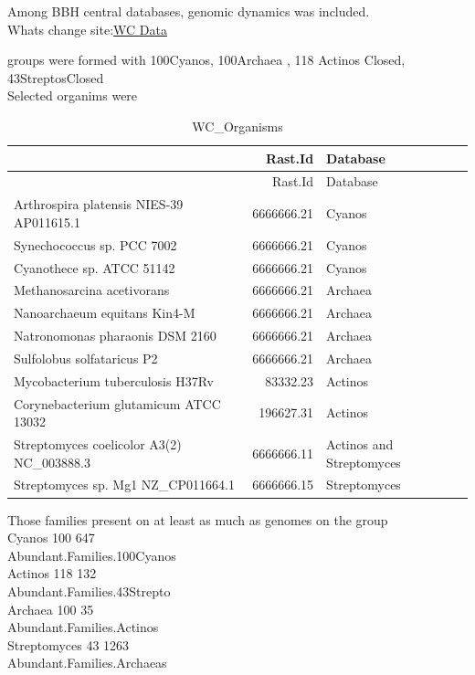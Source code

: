 \documentclass[12pt,twoside]{reedthesis}
\begin{document}
  Among BBH central databases, genomic dynamics was included.\\
  Whats change
  site:\href{http://pubseed.theseed.org/wc.cgi?request=show_otus\&base=/homes/nselem/Data/CS}{WC
  Data}
  
  groups were formed with 100Cyanos, 100Archaea , 118 Actinos Closed,
  43StreptosClosed\\
  Selected organims were
  
  \begin{Shaded}
  \begin{Highlighting}[]
  \StringTok{ }\NormalTok{(}\NormalTok{, } \NormalTok{,}\NormalTok{)}
   \CharTok{\textbackslash{}\textbackslash{}}\NormalTok{,} \NormalTok{)}
  \end{Highlighting}
  \end{Shaded}
  
  \begin{longtable}[]{@{}lrl@{}}
  \caption{WC\_Organisms \label{tab:WC_Organisms}}\tabularnewline
  \toprule
  & Rast.Id & Database\tabularnewline
  \midrule
  \endfirsthead
  \toprule
  & Rast.Id & Database\tabularnewline
  \midrule
  \endhead
  Arthrospira platensis NIES-39 AP011615.1 & 6666666.21 &
  Cyanos\tabularnewline
  Synechococcus sp. PCC 7002 & 6666666.21 & Cyanos\tabularnewline
  Cyanothece sp. ATCC 51142 & 6666666.21 & Cyanos\tabularnewline
  Methanosarcina acetivorans & 6666666.21 & Archaea\tabularnewline
  Nanoarchaeum equitans Kin4-M & 6666666.21 & Archaea\tabularnewline
  Natronomonas pharaonis DSM 2160 & 6666666.21 & Archaea\tabularnewline
  Sulfolobus solfataricus P2 & 6666666.21 & Archaea\tabularnewline
  Mycobacterium tuberculosis H37Rv & 83332.23 & Actinos\tabularnewline
  Corynebacterium glutamicum ATCC 13032 & 196627.31 &
  Actinos\tabularnewline
  Streptomyces coelicolor A3(2) NC\_003888.3 & 6666666.11 & Actinos and
  Streptomyces\tabularnewline
  Streptomyces sp. Mg1 NZ\_CP011664.1 & 6666666.15 &
  Streptomyces\tabularnewline
  \bottomrule
  \end{longtable}
  
  Those families present on at least as much as genomes on the group\\
  Cyanos 100 647\\
  Abundant.Families.100Cyanos\\
  Actinos 118 132\\
  Abundant.Families.43Strepto\\
  Archaea 100 35\\
  Abundant.Families.Actinos\\
  Streptomyces 43 1263\\
  Abundant.Families.Archaeas
  
\end{document}
